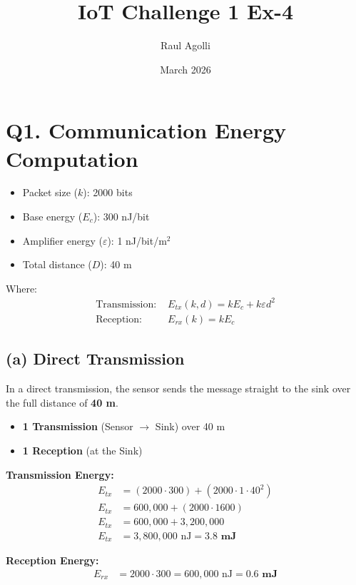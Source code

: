 \documentclass[11pt]{article}
\title{IoT Challenge 1 Ex-4}
\author{Raul Agolli}
\date{March 2026}
\begin{document}
\maketitle

\section*{Q1. Communication Energy Computation}

\begin{itemize}
    \item Packet size ($k$): 2000 bits
    \item Base energy ($E_c$): 300 nJ/bit
    \item Amplifier energy ($\varepsilon$): 1 nJ/bit/m$^2$
    \item Total distance ($D$): 40 m
\end{itemize}

Where:
\begin{align*}
    \text{Transmission: } & E_{tx}(k,d) = kE_c + k\varepsilon d^2 \\
    \text{Reception: } & E_{rx}(k) = kE_c
\end{align*}

\subsection*{(a) Direct Transmission}
In a direct transmission, the sensor sends the message straight to the sink over the full distance of \textbf{40 m}. 
\begin{itemize}
    \item \textbf{1 Transmission} (Sensor $\rightarrow$ Sink) over 40 m
    \item \textbf{1 Reception} (at the Sink)
\end{itemize}

\textbf{Transmission Energy:}
\begin{align*}
    E_{tx} &= (2000 \cdot 300) + (2000 \cdot 1 \cdot 40^2) \\
    E_{tx} &= 600,000 + (2000 \cdot 1600) \\
    E_{tx} &= 600,000 + 3,200,000 \\
    E_{tx} &= 3,800,000 \text{ nJ} = \mathbf{3.8 \text{ mJ}}
\end{align*}

\textbf{Reception Energy:}
\begin{align*}
    E_{rx} &= 2000 \cdot 300 = 600,000 \text{ nJ} = \mathbf{0.6 \text{ mJ}}
\end{align*}
\end{document}
